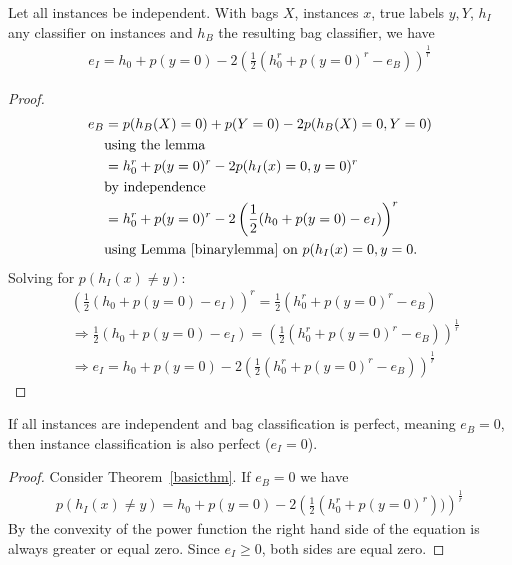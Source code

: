 \begin{theorema}
Let all instances be independent. With bags $X$, instances $x$, true labels $y,Y$, $h_I$ any classifier
on instances and $h_B$ the resulting bag classifier, we have
\begin{align*}
   e_I = h_0 + p(y=0) - 2 \left (\frac{1}{2} ( h_0^r + p(y=0)^r - e_B) \right)^\frac{1}{r}
\end{align*}
\begin{proof}
    
\begin{align*}
e_B & = p(h_B(X) = 0) + p(Y=0) -2 p(h_B(X)=0, Y=0) \\\
&\text{using the lemma}\\
& = h_0^r + p(y=0)^r -2 p(h_I(x)=0, y=0)^r\\\
&\text{by independence}\\
& = h_0^r + p(y=0)^r -2 \left ( \frac{1}{2} (h_0 + p(y=0) - e_I) \right ) ^r \\
&\text{using Lemma~\ref{binarylemma} on }p(h_I(x)=0, y=0.
\end{align*}
Solving for $p(h_I(x)\neq y)$:
\begin{align*}
    & \left ( \frac{1}{2} (h_0 + p(y=0) - e_I )\right ) ^r = \frac{1}{2} \left ( h_0^r + p(y=0)^r - e_B \right )\\
    & \Rightarrow \frac{1}{2} (h_0 + p(y=0) - e_I)   = \left ( \frac{1}{2} \left ( h_0^r + p(y=0)^r - e_B \right ) \right )^\frac{1}{r}\\
    & \Rightarrow e_I   = h_0 + p(y=0) - 2 \left ( \frac{1}{2} \left ( h_0^r + p(y=0)^r - e_B \right ) \right )^\frac{1}{r}
\end{align*}
\end{proof}
\end{theorema}

\begin{corollarya}
If all instances are independent and bag classification is perfect, meaning $e_B=0$, then instance classification is also perfect ($e_I =0$).

\begin{proof}
Consider Theorem~\ref{basicthm}. If $e_B=0$ we have
\begin{align*}
p(h_I(x) \neq y) = h_0 + p(y=0) - 2 \left (\frac{1}{2} ( h_0^r + p(y=0)^r)) \right)^\frac{1}{r}
\end{align*}
By the convexity of the power function the right hand side of the equation is always greater or equal zero.
Since $e_I \geq 0$, both sides are equal zero.
\end{proof}
\end{corollarya}

